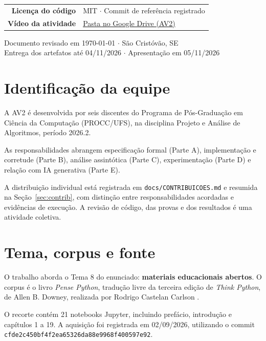 \documentclass[11pt,a4paper]{article}
\theoremstyle{plain}
\theoremstyle{definition}
\theoremstyle{plain}
\begin{document}
\begin{titlepage}
\begin{tabular}{@{}r@{\quad}l@{}}
\textbf{Licença do código} & MIT $\cdot$ Commit de referência registrado\\

\textbf{Vídeo da atividade} & \small\href{https://drive.google.com/drive/folders/1qF5mMkBG4x6ZlZMEypKzlrl6P9b71Dy7?usp=sharing}{Pasta no Google Drive (AV2)}\\
\end{tabular}

\vfill
{\footnotesize\color{cinza}
Documento revisado em \today{} $\cdot$ São Cristóvão, SE\\
Entrega dos artefatos até 04/11/2026 $\cdot$ Apresentação em 05/11/2026\par}
\end{titlepage}



\section{Identificação da equipe}

A AV2 é desenvolvida por seis discentes do
Programa de Pós-Graduação em Ciência da
Computação (PROCC/UFS), na disciplina
Projeto e Análise de Algoritmos, período
2026.2.

As responsabilidades abrangem especificação
formal (Parte A), implementação e corretude
(Parte B), análise assintótica (Parte C),
experimentação (Parte D) e relação com IA
generativa (Parte E).

A distribuição individual está registrada
em \texttt{docs/CONTRIBUICOES.md} e
resumida na Seção~\ref{sec:contrib},
com distinção entre responsabilidades
acordadas e evidências de execução.
A revisão de código, das provas e dos
resultados é uma atividade coletiva.


\section{Tema, corpus e fonte}

O trabalho aborda o Tema 8 do enunciado:
\textbf{materiais educacionais abertos}.
O corpus é o livro \emph{Pense Python},
tradução livre da terceira edição de
\emph{Think Python}, de Allen B. Downey,
realizada por Rodrigo Castelan Carlson
\cite{downey2024thinkpython}.

O recorte contém 21 notebooks Jupyter,
incluindo prefácio, introdução e capítulos
1 a 19. A aquisição foi registrada em
02/09/2026, utilizando o commit
\texttt{cfde2c450bf4f2ea65326}\allowbreak\texttt{da88e9968f400597e92}.
\end{document}
